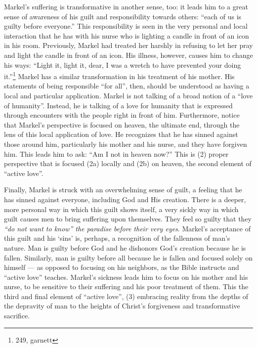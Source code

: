 	Markel's suffering is transformative in another sense, too: it leads him to a great sense of awareness of his guilt and responsibility towards others: ``each of us is guilty before everyone.'' This responsibility is seen in the very personal and local interaction that he has with his nurse who is lighting a candle in front of an icon in his room. Previously, Markel had treated her harshly in refusing to let her pray and light the candle in front of an icon. His illness, however, causes him to change his ways: ``Light it, light it, dear, I was a wretch to have prevented your doing it.''\footnote{249, garnett} Markel has a similar transformation in his treatment of his mother. His statements of being responsible ``for all'', then, should be understood as having a local and particular application. Markel is not talking of a broad notion of a ``love of humanity''. Instead, he is talking of a love for humanity that is expressed through encounters with the people right in front of him. Furthermore, notice that Markel's perspective is focused on heaven, the ultimate end, through the lens of this local application of love. He recognizes that he has sinned against those around him, particularly his mother and his nurse, and they have forgiven him. This leads him to ask: ``Am I not in heaven now?'' This is (2) proper perspective that is focused (2a) locally and (2b) on heaven, the second element of ``active love''.
	
	Finally, Markel is struck with an overwhelming sense of guilt, a feeling that he has sinned against everyone, including God and His creation. There is a deeper, more personal way in which this guilt shows itself, a very sickly way in which guilt causes men to bring suffering upon themselves. They feel so guilty that they \emph{``do not want to know'' the paradise before their very eyes}. Markel's acceptance of this guilt and his `sins' is, perhaps, a recognition of the fallenness of man's nature. Man is guilty before God and he dishonors God's creation because he is fallen.  Similarly, man is guilty before all because he is fallen and focused solely on himself --- as opposed to focusing on his neighbors, as the Bible instructs and ``active love'' teaches.  Markel's sickness leads him to focus on his mother and his nurse, to be sensitive to their suffering and his poor treatment of them. This the third and final element of ``active love'', (3) embracing reality from the depths of the depravity of man to the heights of Christ's forgiveness and transformative sacrifice. 
	
